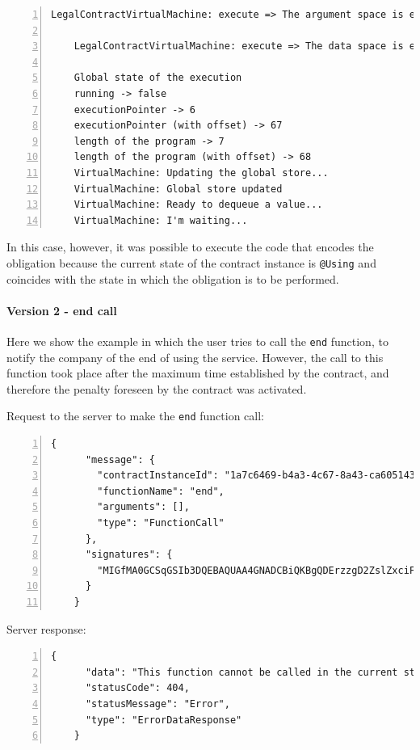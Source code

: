 {\begin{Verbatim}[numbers=left,xleftmargin=1cm,firstnumber=1,breaklines=true,breakanywhere=true,tabsize=2]
    LegalContractVirtualMachine: execute => The argument space is empty
  
    LegalContractVirtualMachine: execute => The data space is empty
  
    Global state of the execution
    running -> false
    executionPointer -> 6
    executionPointer (with offset) -> 67
    length of the program -> 7
    length of the program (with offset) -> 68
    VirtualMachine: Updating the global store...
    VirtualMachine: Global store updated
    VirtualMachine: Ready to dequeue a value...
    VirtualMachine: I'm waiting...
  \end{Verbatim}
}

In this case, however, it was possible to execute the code that encodes the obligation because the current 
state of the contract instance is \verb|@Using| and coincides with the state in which the obligation is to 
be performed.

\paragraph{Version 2 - end call}

Here we show the example in which the user tries to call the \verb|end| function, to notify the company 
of the end of using the service. However, the call to this function took place after the maximum time 
established by the contract, and therefore the penalty foreseen by the contract was activated.

Request to the server to make the \verb|end| function call:
{
  \small
  \begin{Verbatim}[numbers=left,xleftmargin=1cm,firstnumber=1,breaklines=true,breakanywhere=true,tabsize=2]
    {
      "message": {
        "contractInstanceId": "1a7c6469-b4a3-4c67-8a43-ca60514345f6",
        "functionName": "end",
        "arguments": [],
        "type": "FunctionCall"
      },
      "signatures": {
        "MIGfMA0GCSqGSIb3DQEBAQUAA4GNADCBiQKBgQDErzzgD2ZslZxciFAiX3/ot7lrkZDw4148jFZrsDZPE6CVs9xXFSHGgy/mFvIFLXhnChO6Nyd2be3lbgeavLMCMVUiTStXr117Km17keWpb3sItkKKsLFBOcIIU8XXowI/OhzQN2XPZYESHgjdQ5vwEj2YyueiS7WKP94YWz/pswIDAQAB": "Ow8gS8d5SChD3E5CgtsnFHTRWskdeWW2IsTLQJk92mS40LfVtPcxuDiIbzL7xWwtUTMFxza+/TSxU+rMsVvMqQLLyUQ4e6UrLO25+Nr7p5x013JGIaxc18G5kqEuS4iEyiqN1479E4ElLROE+VpI5DBAKMegw0h9m5cbtHFN/fA="
      }
    }
  \end{Verbatim}
}

Server response:
{
  \small
  \begin{Verbatim}[numbers=left,xleftmargin=1cm,firstnumber=1,breaklines=true,breakanywhere=true,tabsize=2]
    {
      "data": "This function cannot be called in the current state",
      "statusCode": 404,
      "statusMessage": "Error",
      "type": "ErrorDataResponse"
    }
  \end{Verbatim}
}

